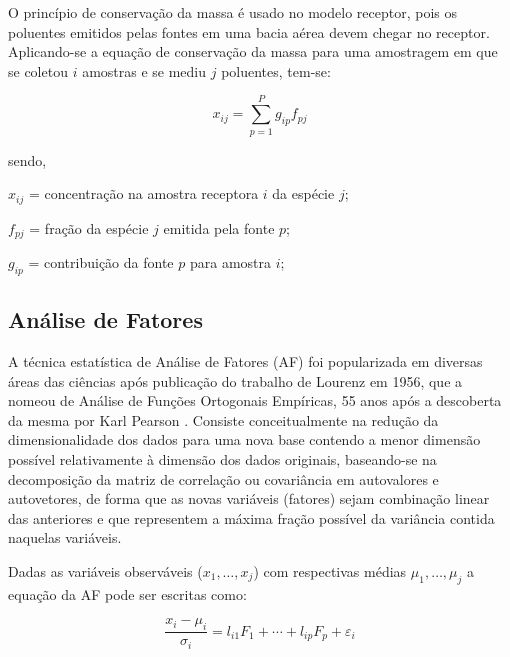 O princípio de conservação da massa é usado no modelo receptor, pois os 
poluentes emitidos pelas fontes em uma bacia aérea devem chegar no 
receptor. Aplicando-se a equação de conservação da massa para uma amostragem 
em que se coletou $i$ amostras e se mediu $j$ poluentes, tem-se:

\begin{equation}
  \label{eq:conservacaomassa}
  x_{ij} = \sum_{p=1}^{P} g_{ip}f_{pj} %
\end{equation} 

sendo,
\begin{itemize}
  \begin{spacing}{1.0}
    \item $x_{ij}$ = concentração na amostra receptora $i$ da espécie $j$;
    \item $f_{pj}$ = fração da espécie $j$ emitida pela fonte $p$;
    \item $g_{ip}$ = contribuição da fonte $p$ para amostra $i$;
  \end{spacing}
\end{itemize}

\subsection{Análise de Fatores}

A técnica estatística de Análise de Fatores (AF) foi popularizada em diversas 
áreas das ciências após publicação do trabalho de Lourenz em 1956, que a nomeou
de Análise de Funções Ortogonais Empíricas, 55 anos após a 
descoberta da mesma por Karl Pearson \citep{bartholomew2011}. Consiste 
conceitualmente na redução da dimensionalidade dos dados para uma nova base 
contendo a menor dimensão possível relativamente à dimensão dos dados originais, 
baseando-se na decomposição da matriz de correlação ou covariância em 
autovalores e autovetores, de forma que as novas variáveis (fatores) sejam 
combinação linear das anteriores e que representem a máxima fração possível da 
variância contida naquelas variáveis.

Dadas as variáveis observáveis ($x_1,\dots,x_j$) com 
respectivas médias $\mu_1,\dots,\mu_j$ a equação da AF pode ser escritas como: 
 
\begin{equation}
  \label{eq:af}
  \frac{x_i-\mu_i}{\sigma_i} = l_{i1} F_1 + \cdots + l_{ip} F_p + \varepsilon_i 
\end{equation}

